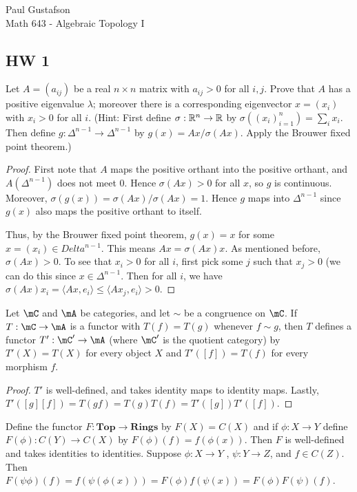 \documentclass{article}
\begin{document}
\noindent Paul Gustafson\\
\noindent Math 643 - Algebraic Topology I

\subsection*{HW 1}
 Let $A = (a_{ij})$ be a real $n \times n$ matrix with $a_{ij} > 0$ for all $i,j$. Prove that $A$ has a positive
eigenvalue $\lambda$; moreover there is a corresponding eigenvector $x = (x_i)$ with $x_i > 0$ for all $i$.
(Hint: First define $\sigma: \mathbb{R}^n \to \mathbb{R}$ by $\sigma((x_i)_{i=1}^n) = \sum_i x_i$. Then define $g: \Delta^{n-1} \to \Delta^{n-1}$
by $g(x) = Ax / \sigma(Ax)$. Apply the Brouwer fixed point theorem.)

\begin{proof}
  First note that $A$ maps the positive orthant into the positive orthant, and $A(\Delta^{n-1})$ does not meet $0$.  Hence
$\sigma(Ax) > 0$ for all $x$, so $g$ is continuous.
 Moreover, $\sigma(g(x)) = \sigma(Ax) / \sigma(Ax) = 1$.  Hence $g$ maps into $\Delta^{n-1}$ since $g(x)$ also maps the positive
orthant to itself.

Thus, by the Brouwer fixed point theorem, $g(x) = x$ for some $x = (x_i) \in Delta^{n-1}$. This means $Ax = \sigma(Ax) x$. As
mentioned before, $\sigma(Ax) > 0$.  To see that $x_i > 0$ for all $i$, first pick some $j$ such that $x_j > 0$ (we can do this
since $x \in \Delta^{n-1}$. Then for all $i$, we have $\sigma(Ax) x_i = \langle Ax, e_i \rangle  \le \langle Ax_j, e_i \rangle > 0$.
\end{proof} 

 Let $\mC$ and $\mA$ be categories, and let $\sim$ be a congruence on $\mC$. If $T: \mC \to \mA$ is a functor
with $T(f) = T(g)$ whenever $f \sim g$, then $T$ defines a functor $T': \mC' \to \mA$ (where $\mC'$ is the quotient
category) by $T'(X) = T(X)$ for every object $X$ and $T'([f]) = T(f)$ for every morphism $f$.
\begin{proof}
$T'$ is well-defined, and takes identity maps to identity maps. Lastly, $T'([g] [f]) = T(g f) = T(g) T(f) = T'([g])T'([f])$.
\end{proof}

 Define the functor $F: \mathbf{Top} \to \mathbf{Rings}$ by $F(X) = C(X)$ and if $\phi:X \to Y$
define $F(\phi): C(Y) \to C(X)$ by $F(\phi)(f) = f(\phi(x))$.  Then $F$ is well-defined and takes identities to identities.
Suppose $\phi: X\to Y$ , $\psi: Y \to Z$, and $f \in C(Z)$.  Then $F(\psi \phi)(f) = f(\psi(\phi(x))) = F(\phi) f(\psi(x)) = 
F(\phi) F(\psi) (f)$.
\end{document}
